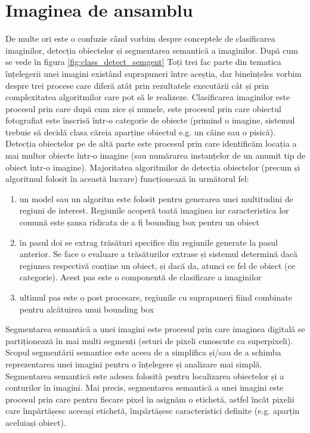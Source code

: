 \section{Imaginea de ansamblu}
De multe ori este o confuzie când vorbim despre conceptele de clasificarea imaginilor, detecția obiectelor și segmentarea semantică a imaginilor. După cum se vede în figura \ref{fig:class_detect_semgent} Toți trei fac parte din tematica înțelegerii unei imagini existând suprapuneri între aceștia, dar bineînțeles vorbim despre trei procese care diferă atât prin rezultatele executării cât și prin complexitatea algoritmilor care pot să le realizeze.\newline
Clasificarea imaginilor este procesul prin care după cum zice și numele, este procesul prin care obiectul fotografiat este înscrisă într-o categorie de obiecte (primind o imagine, sistemul trebuie să decidă clasa căreia aparține obiectul e.g. un câine sau o pisică).\newline
Detecția obiectelor pe de altă parte este procesul prin care identificăm locația a mai multor obiecte într-o imagine (sau numărarea instanțelor de un anumit tip de obiect într-o imagine). Majoritatea algoritmilor de detecția obiectelor (precum și algoritmul folosit în această lucrare) funcționează în următorul fel:
\begin{enumerate}
	\item un model sau un algoritm este folosit pentru generarea unei multitudini de regiuni de interest. Regiunile acoperă toată imaginea iar caracteristica lor comună este șansa ridicata de a fi bounding box pentru un obiect
	\item în pasul doi se extrag trăsături specifice din regiunile generate la pasul anterior. Se face o evaluare a trăsăturilor extrase și sistemul determină dacă regiunea respectivă conține un obiect, și dacă da, atunci ce fel de obiect (ce categorie). Acest pas este o componentă de clasificare a imaginilor
	\item ultimul pas este o post procesare, regiunile cu suprapuneri fiind combinate pentru alcătuirea unui bounding box
\end{enumerate}
Segmentarea semantică a unei imagini este procesul prin care imaginea digitală se partiționează în mai multi segmenți (seturi de pixeli cunoscute ca superpixeli). Scopul segmentării semantice este aceea de a simplifica și/sau de a schimba reprezentarea unei imagini pentru o înțelegere și analizare mai simplă. Segmentarea semantică este adesea folosită pentru localizarea obiectelor și a conturilor în imagini. Mai precis, segmentarea semantică a unei imagini este procesul prin care pentru fiecare pixel în asignăm o etichetă, astfel încât pixelii care împărtășesc aceeași etichetă, împărtășesc caracteristici definite (e.g. aparțin aceluiași obiect).
